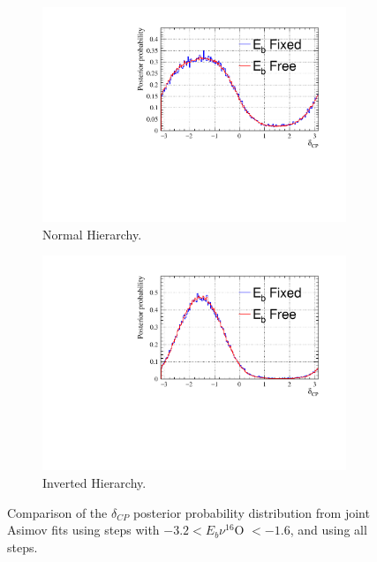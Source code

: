 \begin{figure}[!htbp]
\centering
\begin{subfigure}{.7\textwidth}
  \centering
  \includegraphics[width=0.95\linewidth]{figs/compMaCh3Contours_EB_asimov/compMaCh3Contours_EB_dcp_asimovA_NH}
  \caption{Normal Hierarchy.}
  \label{fig:EBdcpNH}
\end{subfigure}
\begin{subfigure}{.7\textwidth}
  \centering
  \includegraphics[width=0.95\linewidth]{figs/compMaCh3Contours_EB_asimov/compMaCh3Contours_EB_dcp_asimovA_IH}
  \caption{Inverted Hierarchy.}
  \label{fig:EBdcpIH}
\end{subfigure}
\caption{Comparison of the $\delta_{CP}$ posterior probability distribution from joint Asimov fits using steps with $ -3.2 < E_b \nu ^{16}$O $< -1.6$, and using all steps.}
\label{fig:EBdcp}
\end{figure}


